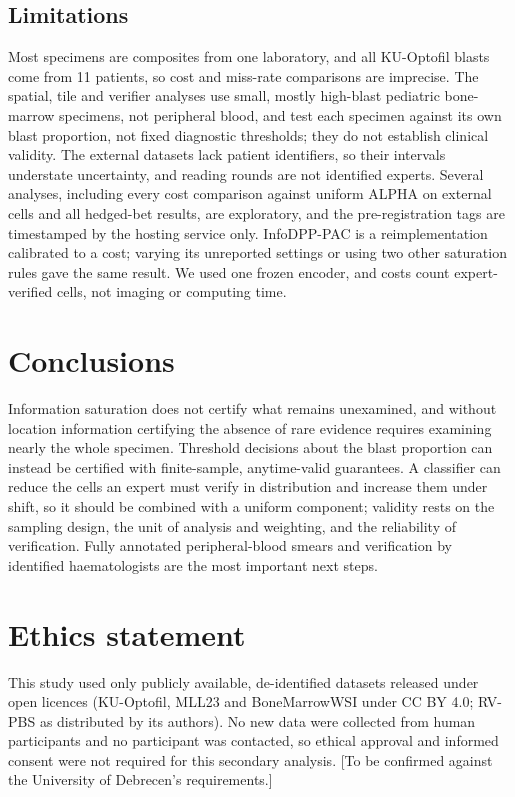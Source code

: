 \documentclass[preprint,12pt]{elsarticle}
\theoremstyle{remark}
\theoremstyle{definition}
\begin{document}
\subsection{Limitations}
Most specimens are composites from one laboratory, and all KU-Optofil blasts come from 11 patients, so cost and miss-rate comparisons are imprecise. The spatial, tile and verifier analyses use small, mostly high-blast pediatric bone-marrow specimens, not peripheral blood, and test each specimen against its own blast proportion, not fixed diagnostic thresholds; they do not establish clinical validity. The external datasets lack patient identifiers, so their intervals understate uncertainty, and reading rounds are not identified experts. Several analyses, including every cost comparison against uniform ALPHA on external cells and all hedged-bet results, are exploratory, and the pre-registration tags are timestamped by the hosting service only. InfoDPP-PAC is a reimplementation calibrated to a cost; varying its unreported settings or using two other saturation rules gave the same result. We used one frozen encoder, and costs count expert-verified cells, not imaging or computing time.

\section{Conclusions}
Information saturation does not certify what remains unexamined, and without location information certifying the absence of rare evidence requires examining nearly the whole specimen. Threshold decisions about the blast proportion can instead be certified with finite-sample, anytime-valid guarantees. A classifier can reduce the cells an expert must verify in distribution and increase them under shift, so it should be combined with a uniform component; validity rests on the sampling design, the unit of analysis and weighting, and the reliability of verification. Fully annotated peripheral-blood smears and verification by identified haematologists are the most important next steps.

\section*{Ethics statement}
This study used only publicly available, de-identified datasets released under open licences (KU-Optofil, MLL23 and BoneMarrowWSI under CC BY 4.0; RV-PBS as distributed by its authors). No new data were collected from human participants and no participant was contacted, so ethical approval and informed consent were not required for this secondary analysis. [To be confirmed against the University of Debrecen's requirements.]
\end{document}
